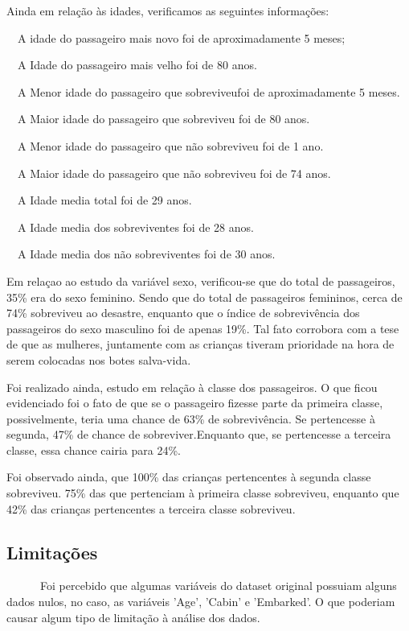 \documentclass[11pt]{article}
\begin{document}
Ainda em relação às idades, verificamos as seguintes informações:

 A idade do passageiro mais novo foi de aproximadamente 5 meses;

 A Idade do passageiro mais velho foi de 80 anos.

 A Menor idade do passageiro que sobreviveufoi de aproximadamente 5
meses.

 A Maior idade do passageiro que sobreviveu foi de 80 anos.

 A Menor idade do passageiro que não sobreviveu foi de 1 ano.

 A Maior idade do passageiro que não sobreviveu foi de 74 anos.

 A Idade media total foi de 29 anos.

 A Idade media dos sobreviventes foi de 28 anos.

 A Idade media dos não sobreviventes foi de 30 anos.

Em relaçao ao estudo da variável sexo, verificou-se que do total de
passageiros, 35\% era do sexo feminino. Sendo que do total de
passageiros femininos, cerca de 74\% sobreviveu ao desastre, enquanto
que o índice de sobrevivência dos passageiros do sexo masculino foi de
apenas 19\%. Tal fato corrobora com a tese de que as mulheres,
juntamente com as crianças tiveram prioridade na hora de serem colocadas
nos botes salva-vida.

Foi realizado ainda, estudo em relação à classe dos passageiros. O que
ficou evidenciado foi o fato de que se o passageiro fizesse parte da
primeira classe, possivelmente, teria uma chance de 63\% de
sobrevivência. Se pertencesse à segunda, 47\% de chance de
sobreviver.Enquanto que, se pertencesse a terceira classe, essa chance
cairia para 24\%.

Foi observado ainda, que 100\% das crianças pertencentes à segunda
classe sobreviveu. 75\% das que pertenciam à primeira classe sobreviveu,
enquanto que 42\% das crianças pertencentes a terceira classe
sobreviveu.

    \subsection{Limitações}\label{limitauxe7uxf5es}

       Foi percebido que algumas variáveis do dataset original possuiam
alguns dados nulos, no caso, as variáveis 'Age', 'Cabin' e 'Embarked'. O
que poderiam causar algum tipo de limitação à análise dos dados.
\end{document}

